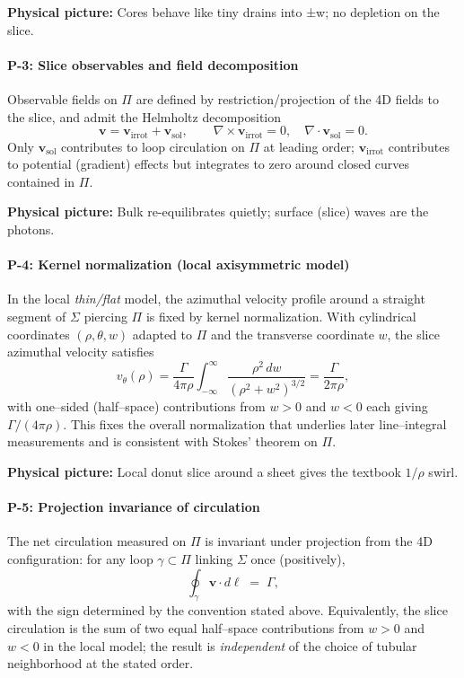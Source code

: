 \begin{physbox}\textbf{Physical picture:} Cores behave like tiny drains into ±w; no depletion on the slice.\end{physbox}

\paragraph{P-3: Slice observables and field decomposition}
\label{post:P3}
Observable fields on $\Pi$ are defined by restriction/projection of the 4D fields to the slice, and admit the Helmholtz decomposition
\[
\mathbf{v}=\mathbf{v}_{\mathrm{irrot}}+\mathbf{v}_{\mathrm{sol}},\qquad
\nabla\times \mathbf{v}_{\mathrm{irrot}}=0,\quad
\nabla\cdot \mathbf{v}_{\mathrm{sol}}=0.
\]
Only $\mathbf{v}_{\mathrm{sol}}$ contributes to loop circulation on $\Pi$ at leading order; $\mathbf{v}_{\mathrm{irrot}}$ contributes to potential (gradient) effects but integrates to zero around closed curves contained in $\Pi$.

\begin{physbox}\textbf{Physical picture:} Bulk re-equilibrates quietly; surface (slice) waves are the photons.\end{physbox}

\paragraph{P-4: Kernel normalization (local axisymmetric model)}
\label{post:P4}
In the local \emph{thin/flat} model, the azimuthal velocity profile around a straight segment of $\Sigma$ piercing $\Pi$ is fixed by kernel normalization. With cylindrical coordinates $(\rho,\theta,w)$ adapted to $\Pi$ and the transverse coordinate $w$, the slice azimuthal velocity satisfies
\[
v_\theta(\rho)
=\frac{\Gamma}{4\pi\rho}\!\int_{-\infty}^{\infty}\frac{\rho^2\,dw}{(\rho^2+w^2)^{3/2}}
=\frac{\Gamma}{2\pi\rho},
\]
with one–sided (half–space) contributions from $w>0$ and $w<0$ each giving $\Gamma/(4\pi\rho)$. This fixes the overall normalization that underlies later line–integral measurements and is consistent with Stokes' theorem on $\Pi$.

\begin{physbox}\textbf{Physical picture:} Local donut slice around a sheet gives the textbook $1/\rho$ swirl.\end{physbox}

\paragraph{P-5: Projection invariance of circulation}
\label{post:P5}
The net circulation measured on $\Pi$ is invariant under projection from the 4D configuration: for any loop $\gamma\subset\Pi$ linking $\Sigma$ once (positively),
\[
\oint_{\gamma}\mathbf{v}\cdot d\boldsymbol{\ell}\;=\;\Gamma,
\]
with the sign determined by the convention stated above. Equivalently, the slice circulation is the sum of two equal half–space contributions from $w>0$ and $w<0$ in the local model; the result is \emph{independent} of the choice of tubular neighborhood at the stated order.

